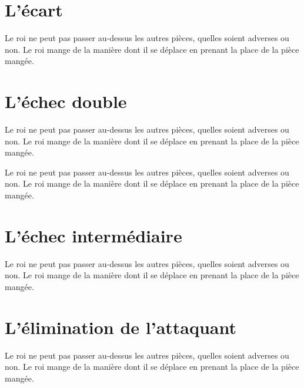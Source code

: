 \documentclass[a5paper,openany,twocolumn]{book}%
\begin{document}

\chapter{L'écart}

Le roi ne peut pas passer au-dessus les autres pièces, quelles soient adverses ou non. Le roi mange de la manière dont il se déplace en prenant la place de la pièce mangée. 


\chapter{L'échec double}

Le roi ne peut pas passer au-dessus les autres pièces, quelles soient adverses ou non. Le roi mange de la manière dont il se déplace en prenant la place de la pièce mangée. 


Le roi ne peut pas passer au-dessus les autres pièces, quelles soient adverses ou non. Le roi mange de la manière dont il se déplace en prenant la place de la pièce mangée. 

\chapter{L'échec intermédiaire}


Le roi ne peut pas passer au-dessus les autres pièces, quelles soient adverses ou non. Le roi mange de la manière dont il se déplace en prenant la place de la pièce mangée. 

\chapter{L'élimination de l'attaquant}

Le roi ne peut pas passer au-dessus les autres pièces, quelles soient adverses ou non. Le roi mange de la manière dont il se déplace en prenant la place de la pièce mangée. 
\end{document}
